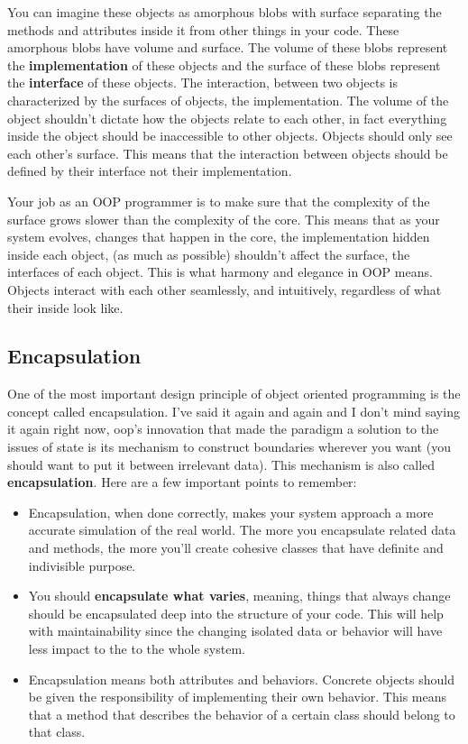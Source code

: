 You can imagine these objects as amorphous blobs with surface separating
the methods and attributes inside it from other things in your code.
These amorphous blobs have volume and surface. The volume of these blobs
represent the \textbf{implementation} of these objects and the surface
of these blobs represent the \textbf{interface} of these objects. The
interaction, between two objects is characterized by the surfaces of
objects, the implementation. The volume of the object shouldn't dictate
how the objects relate to each other, in fact everything inside the
object should be inaccessible to other objects. Objects should only see
each other's surface. This means that the interaction between objects
should be defined by their interface not their implementation.

Your job as an OOP programmer is to make sure that the complexity of the
surface grows slower than the complexity of the core. This means that as
your system evolves, changes that happen in the core, the implementation
hidden inside each object, (as much as possible) shouldn't affect the
surface, the interfaces of each object. This is what harmony and
elegance in OOP means. Objects interact with each other seamlessly, and
intuitively, regardless of what their inside look like.

\subsection{Encapsulation}\label{object-oriented-programming-paradigm.md__encapsulation}

One of the most important design principle of object oriented
programming is the concept called encapsulation. I've said it again and
again and I don't mind saying it again right now, oop's innovation that
made the paradigm a solution to the issues of state is its mechanism to
construct boundaries wherever you want (you should want to put it
between irrelevant data). This mechanism is also called
\textbf{encapsulation}. Here are a few important points to remember:

\begin{itemize}
\tightlist
\item
  Encapsulation, when done correctly, makes your system approach a more
  accurate simulation of the real world. The more you encapsulate
  related data and methods, the more you'll create cohesive classes that
  have definite and indivisible purpose.
\item
  You should \textbf{encapsulate what varies}, meaning, things that
  always change should be encapsulated deep into the structure of your
  code. This will help with maintainability since the changing isolated
  data or behavior will have less impact to the to the whole system.
\item
  Encapsulation means both attributes and behaviors. Concrete objects
  should be given the responsibility of implementing their own behavior.
  This means that a method that describes the behavior of a certain
  class should belong to that class.
\end{itemize}

